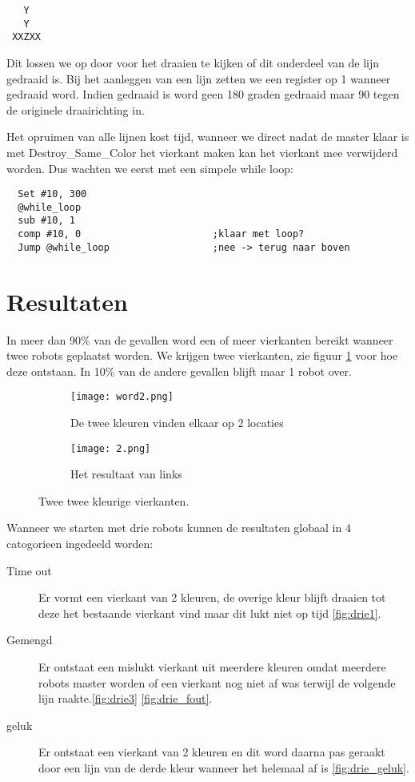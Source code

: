 \documentclass[10pt]{article}
\begin{document}
\begin{verbatim}
   Y
   Y
 XXZXX
\end{verbatim}

Dit lossen we op door voor het draaien te kijken of dit onderdeel van de lijn gedraaid is. Bij het aanleggen van een lijn zetten we een register op 1 wanneer gedraaid word. Indien gedraaid is word geen 180 graden gedraaid maar 90 tegen de originele draairichting in.

Het opruimen van alle lijnen kost tijd, wanneer we direct nadat de master klaar is met Destroy\_Same\_Color het vierkant maken kan het vierkant mee verwijderd worden. Dus wachten we eerst met een simpele while loop: 

\begin{verbatim}
  Set #10, 300
  @while_loop
  sub #10, 1
  comp #10, 0                       ;klaar met loop?
  Jump @while_loop                  ;nee -> terug naar boven
\end{verbatim}

\pagebreak

\section{Resultaten} 

In meer dan 90\% van de gevallen word een of meer vierkanten bereikt wanneer twee robots geplaatst worden. We krijgen twee vierkanten, zie figuur \ref{fig:1} voor hoe deze ontstaan. In 10\% van de andere gevallen blijft maar 1 robot over.  

\begin{figure}[h!]
  \centering
  \begin{subfigure}[b]{0.4\linewidth}
    \texttt{[image: word2.png]}
    \caption{De twee kleuren vinden elkaar op 2 locaties}
  \end{subfigure}
  \begin{subfigure}[b]{0.4\linewidth}
    \texttt{[image: 2.png]}
    \caption{Het resultaat van links}
  \end{subfigure}
  \caption{Twee twee kleurige vierkanten.}
  \label{fig:1}
\end{figure}

Wanneer we starten met drie robots kunnen de resultaten globaal in 4 catogorieen ingedeeld worden:

\begin{description}
 \item[Time out] Er vormt een vierkant van 2 kleuren, de overige kleur blijft draaien tot deze het bestaande vierkant vind maar dit lukt niet op tijd \ref{fig:drie1}.
 \item[Gemengd] Er ontstaat een mislukt vierkant uit meerdere kleuren omdat meerdere robots master worden of een vierkant nog niet af was terwijl de volgende lijn raakte.\ref{fig:drie3} \ref{fig:drie_fout}.
 \item[geluk] Er ontstaat een vierkant van 2 kleuren en dit word daarna pas geraakt door een lijn van de derde kleur wanneer het helemaal af is \ref{fig:drie_geluk}.
\end{description}
\end{document}
